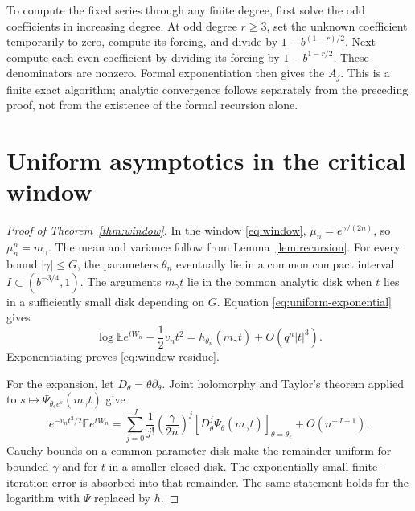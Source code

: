 \documentclass[11pt]{article}
\theoremstyle{definition}
\newcommand{\E}{\mathbb E}
\newcommand{\crit}{\theta_{\mathrm c}}
\begin{document}
To compute the fixed series through any finite degree, first solve the
odd coefficients in increasing degree. At odd degree $r\geq3$, set
the unknown coefficient temporarily to zero, compute its forcing, and
divide by $1-b^{(1-r)/2}$. Next compute each even coefficient by
dividing its forcing by $1-b^{1-r/2}$. These denominators are nonzero.
Formal exponentiation then gives the $A_j$. This is a finite exact
algorithm; analytic convergence follows separately from the preceding
proof, not from the existence of the formal recursion alone.

\section{Uniform asymptotics in the critical window}

\begin{proof}[Proof of Theorem~\ref{thm:window}]
In the window \eqref{eq:window}, $\mu_n=e^{\gamma/(2n)}$, so
$\mu_n^n=m_\gamma$. The mean and variance follow from
Lemma~\ref{lem:recursion}. For every bound $|\gamma|\leq G$, the
parameters $\theta_n$ eventually lie in a common compact interval
$I\subset(b^{-3/4},1)$. The arguments $m_\gamma t$ lie in the common
analytic disk when $t$ lies in a sufficiently small disk depending on
$G$. Equation \eqref{eq:uniform-exponential} gives
\[
 \log\E e^{tW_n}-\frac12v_nt^2
       =h_{\theta_n}(m_\gamma t)+O(q^n|t|^3).
\]
Exponentiating proves \eqref{eq:window-residue}.

For the expansion, let $D_\theta=\theta\partial_\theta$. Joint
holomorphy and Taylor's theorem applied to
$s\mapsto\Psi_{\crit e^s}(m_\gamma t)$ give
\begin{equation}\label{eq:window-taylor}
 e^{-v_nt^2/2}\E e^{tW_n}
 =\sum_{j=0}^{J}\frac1{j!}
       \left(\frac{\gamma}{2n}\right)^j
       \left[D_\theta^j\Psi_\theta(m_\gamma t)\right]_{\theta=\crit}
       +O(n^{-J-1}).
\end{equation}
Cauchy bounds on a common parameter disk make the remainder uniform
for bounded $\gamma$ and for $t$ in a smaller closed disk. The
exponentially small finite-iteration error is absorbed into that
remainder. The same statement holds for the logarithm with $\Psi$
replaced by $h$.
\end{proof}
\end{document}
